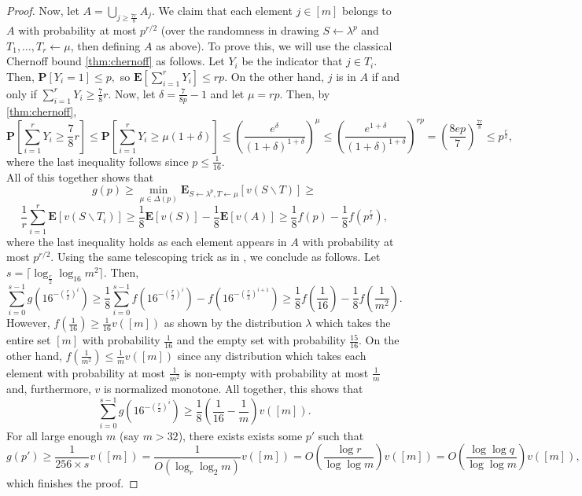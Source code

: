 \documentclass[11pt]{article}\usepackage{amsfonts}
\numberwithin{theorem}{subsection}
\newcommand{\prob}{\mathbf{P}}
\newcommand{\expect}{\mathbf{E}}
\begin{document}
\begin{proof}
\noindent
Now, let $A = \bigcup_{j \ge \frac{7r}{8}}A_j.$ We claim that each element $j \in [m]$ belongs to $A$ with probability at most $p^{r/2}$ (over the randomness in drawing $S \leftarrow \lambda^p$ and $T_1,\ldots, T_r \leftarrow \mu$, then defining $A$ as above). To prove this, we will use the classical Chernoff bound \cref{thm:chernoff} as follows. Let $Y_i$ be the indicator that $j \in T_i.$ Then, 
$\prob[Y_i = 1]\le p,$ so 
$
\expect[\sum_{i = 1}^rY_i] \le rp.
$ On the other hand, $j$ is in $A$ if and only if 
$\sum_{i = 1}^rY_i\ge \frac{7}{8}r.$ Now, let 
$\delta  = \frac{7}{8p}-1$ and let $\mu = rp.$ Then, by \cref{thm:chernoff},
$$
\prob\left[\sum_{i = 1}^rY_i\ge \frac{7}{8}r\right] \le
\prob\left[\sum_{i = 1}^rY_i\ge \mu (1 + \delta)\right] \le 
\left(
\frac{e^{\delta}}{(1+\delta)^{1+\delta}}
\right)^\mu\le 
\left(
\frac{e^{1+\delta}}{(1+\delta)^{1+\delta}}
\right)^{rp} =
\left(\frac{8ep}{7}\right)^{\frac{7r}{8}}\le p^{\frac{r}{2}},
$$
where the last inequality follows since $p\le\frac{1}{16}.$\\

\noindent
All of this together shows that 
$$
g(p) \ge 
\min_{\mu \in \Delta(p)}\expect_{S\leftarrow \lambda^p, T\leftarrow \mu}[v(S\backslash T)]\ge 
$$
$$
\frac{1}{r}\sum_{i  = 1}^r \expect[v(S\backslash T_i)] \ge 
\frac{1}{8}\expect[v(S)] - 
\frac{1}{8}\expect[v(A)] \ge 
\frac{1}{8}f(p) - \frac{1}{8}f(p^{\frac{r}{2}}),
$$
where the last inequality holds as each element appears in $A$ with probability at most $p^{r/2}.$ Using the same telescoping trick as in \cite{DuttingKL20}, we conclude as follows. Let $s = \lceil\log_{\frac{r}{2}}\log_{16} m^2\rceil.$ Then,
$$
\sum_{i = 0}^{s-1} g(16^{-(\frac{r}{2})^i})\ge 
\frac{1}{8}\sum_{i = 0}^{s-1}
f(16^{-(\frac{r}{2})^i})- 
f(16^{-(\frac{r}{2})^{i+1}}) \ge
\frac{1}{8}f\left(\frac{1}{16}\right) - \frac{1}{8}f\left(\frac{1}{m^2}\right).
$$
However, $f(\frac{1}{16})\ge \frac{1}{16}v([m])$ as shown by the distribution $\lambda$ which takes the entire set $[m]$ with probability $\frac{1}{16}$ and the empty set with probability $\frac{15}{16}.$ On the other hand, $f(\frac{1}{m^2})\le \frac{1}{m}v([m])$ since any distribution which takes each element with probability at most $\frac{1}{m^2}$ is non-empty with probability at most $\frac{1}{m}$ and, furthermore, $v$ is normalized monotone. All together, this shows that 
$$
\sum_{i = 0}^{s-1} g(16^{-(\frac{r}{2})^i})\ge 
\frac{1}{8}(\frac{1}{16} - \frac{1}{m})v([m]).
$$
For all large enough $m$ (say $m>32$), there exists exists some $p'$ such that 
$$
g(p') \ge \frac{1}{256\times s}v([m]) = 
\frac{1}{O(\log_r\log_2 m)}v([m]) = 
O\left(\frac{\log r}{\log \log m}\right)v([m]) = 
O\left(\frac{\log \log q}{\log \log m}\right)v([m]),
$$
which finishes the proof.
\end{proof}
\end{document}
